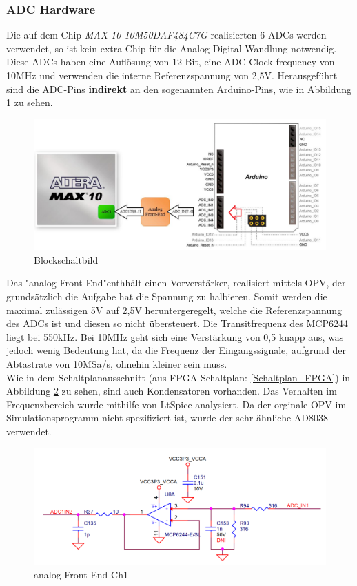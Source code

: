 \subsubsection{ADC Hardware}
Die auf dem Chip \textit{MAX 10 10M50DAF484C7G} realisierten 6 ADCs werden verwendet, so ist kein extra Chip für die Analog-Digital-Wandlung notwendig. Diese ADCs haben eine Auflösung von 12 Bit, eine ADC Clock-frequency von 10MHz und verwenden die interne Referenzspannung von 2,5V. Herausgeführt sind die ADC-Pins \textbf{indirekt} an den sogenannten Arduino-Pins, wie in Abbildung \ref{ADC_Blockschaltbild} zu sehen.
\begin{figure}[!h]
\begin{center}
\includegraphics[width=15cm]{SAUER/Grafiken/ADC_Arduino_Pins.PNG}
\caption{Blockschaltbild}
\label{ADC_Blockschaltbild}
\end{center}
\end{figure}
Das "analog Front-End"enthhält einen Vorverstärker, realisiert mittels OPV, der grundsätzlich die Aufgabe hat die Spannung zu halbieren. Somit werden die maximal zulässigen 5V auf 2,5V heruntergeregelt, welche die Referenzspannung des ADCs ist und diesen so nicht übersteuert. Die Transitfrequenz des MCP6244 liegt bei 550kHz. Bei 10MHz geht sich eine Verstärkung von 0,5 knapp aus, was jedoch wenig Bedeutung hat, da die Frequenz der Eingangssignale, aufgrund der Abtastrate von 10MSa/s, ohnehin kleiner sein muss. \\Wie in dem Schaltplanausschnitt (aus FPGA-Schaltplan: \ref{Schaltplan_FPGA}) in Abbildung \ref{Front-End_Schaltung} zu sehen, sind auch Kondensatoren vorhanden. Das Verhalten im Frequenzbereich wurde mithilfe von LtSpice analysiert. Da der orginale OPV im Simulationsprogramm nicht spezifiziert ist, wurde der sehr ähnliche AD8038 verwendet.
\begin{figure}[!h]
\begin{center}
\includegraphics[width=15cm]{SAUER/Grafiken/ADC_Front-End.PNG}
\caption{analog Front-End Ch1}
\label{Front-End_Schaltung}
\end{center}
\end{figure}

